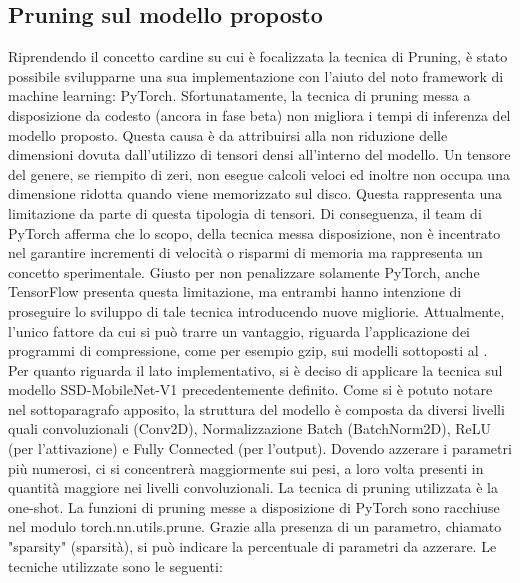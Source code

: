 \subsection{Pruning sul modello proposto}\label{pruning_model}
Riprendendo il concetto cardine su cui è focalizzata la tecnica di Pruning, è stato possibile svilupparne una sua implementazione con l'aiuto del noto framework di machine learning: PyTorch. Sfortunatamente, la tecnica di pruning messa a disposizione da codesto (ancora in fase beta) non migliora i tempi di inferenza del modello proposto. Questa causa è da attribuirsi alla non riduzione delle dimensioni dovuta dall'utilizzo di tensori densi all'interno del modello. Un tensore del genere, se riempito di zeri, non esegue calcoli veloci ed inoltre non occupa una dimensione ridotta quando viene memorizzato sul disco. Questa rappresenta una limitazione da parte di questa tipologia di tensori. Di conseguenza, il team di PyTorch afferma che lo scopo, della tecnica messa disposizione, non è incentrato nel garantire incrementi di velocità o risparmi di memoria ma rappresenta un concetto sperimentale. Giusto per non penalizzare solamente PyTorch, anche TensorFlow presenta questa limitazione, ma entrambi hanno intenzione di proseguire lo sviluppo di tale tecnica introducendo nuove migliorie. Attualmente, l'unico fattore da cui si può trarre un vantaggio, riguarda l'applicazione dei programmi di compressione, come per esempio gzip, sui modelli sottoposti al . 
Per quanto riguarda il lato implementativo, si è deciso di applicare la tecnica sul modello SSD-MobileNet-V1 precedentemente definito. Come si è potuto notare nel sottoparagrafo apposito, la struttura del modello è composta da diversi livelli quali convoluzionali (Conv2D), Normalizzazione Batch (BatchNorm2D), ReLU (per l'attivazione) e Fully Connected (per l'output). Dovendo azzerare i parametri più numerosi, ci si concentrerà maggiormente sui pesi, a loro volta presenti in quantità maggiore nei livelli convoluzionali. 
La tecnica di pruning utilizzata è la one-shot.
La funzioni di pruning messe a disposizione di PyTorch sono racchiuse nel modulo torch.nn.utils.prune. Grazie alla presenza di un parametro, chiamato "sparsity" (sparsità), si può indicare la percentuale di parametri da azzerare. Le tecniche utilizzate sono le seguenti:
